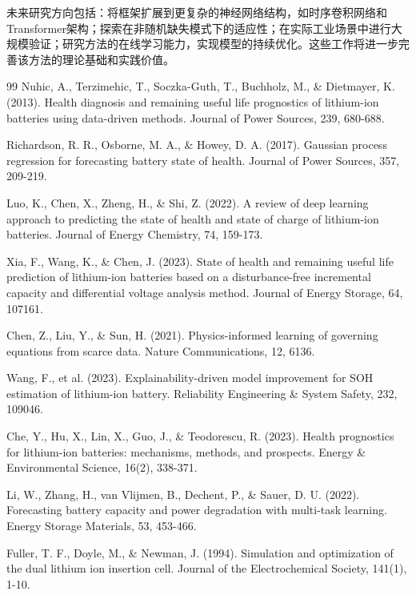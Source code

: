 \documentclass{ctexart}
\begin{document}
未来研究方向包括：将框架扩展到更复杂的神经网络结构，如时序卷积网络和Transformer架构；探索在非随机缺失模式下的适应性；在实际工业场景中进行大规模验证；研究方法的在线学习能力，实现模型的持续优化。这些工作将进一步完善该方法的理论基础和实践价值。

\begin{thebibliography}{99}
 Nuhic, A., Terzimehic, T., Soczka-Guth, T., Buchholz, M., \& Dietmayer, K. (2013). Health diagnosis and remaining useful life prognostics of lithium-ion batteries using data-driven methods. Journal of Power Sources, 239, 680-688.

 Richardson, R. R., Osborne, M. A., \& Howey, D. A. (2017). Gaussian process regression for forecasting battery state of health. Journal of Power Sources, 357, 209-219.

 Luo, K., Chen, X., Zheng, H., \& Shi, Z. (2022). A review of deep learning approach to predicting the state of health and state of charge of lithium-ion batteries. Journal of Energy Chemistry, 74, 159-173.

 Xia, F., Wang, K., \& Chen, J. (2023). State of health and remaining useful life prediction of lithium-ion batteries based on a disturbance-free incremental capacity and differential voltage analysis method. Journal of Energy Storage, 64, 107161.

 Chen, Z., Liu, Y., \& Sun, H. (2021). Physics-informed learning of governing equations from scarce data. Nature Communications, 12, 6136.

 Wang, F., et al. (2023). Explainability-driven model improvement for SOH estimation of lithium-ion battery. Reliability Engineering \& System Safety, 232, 109046.

 Che, Y., Hu, X., Lin, X., Guo, J., \& Teodorescu, R. (2023). Health prognostics for lithium-ion batteries: mechanisms, methods, and prospects. Energy \& Environmental Science, 16(2), 338-371.

 Li, W., Zhang, H., van Vlijmen, B., Dechent, P., \& Sauer, D. U. (2022). Forecasting battery capacity and power degradation with multi-task learning. Energy Storage Materials, 53, 453-466.

 Fuller, T. F., Doyle, M., \& Newman, J. (1994). Simulation and optimization of the dual lithium ion insertion cell. Journal of the Electrochemical Society, 141(1), 1-10.


\end{thebibliography}
\end{document}
